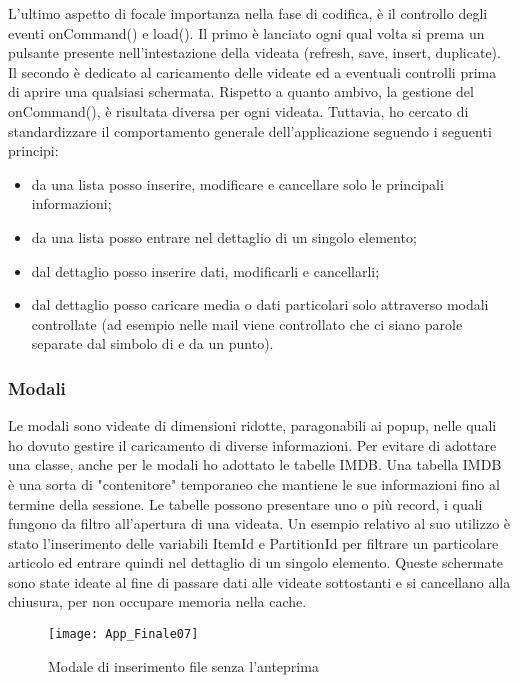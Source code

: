 L'ultimo aspetto di focale importanza nella fase di codifica, è il controllo degli eventi onCommand() e load(). Il primo è lanciato ogni qual volta si prema un pulsante presente nell'intestazione della videata (refresh, save, insert, duplicate).  Il secondo è dedicato al caricamento delle videate ed a eventuali controlli prima di aprire una qualsiasi schermata.
Rispetto a quanto ambivo, la gestione del onCommand(), è risultata diversa per ogni videata.  Tuttavia, ho cercato di standardizzare il comportamento generale dell'applicazione seguendo i seguenti principi:
\begin{itemize}
	\item da una lista posso inserire, modificare e cancellare solo le principali informazioni;
	\item da una lista posso entrare nel dettaglio di un singolo elemento;
	\item dal dettaglio posso inserire dati, modificarli e cancellarli;
	\item dal dettaglio posso caricare media o dati particolari solo attraverso modali controllate (ad esempio nelle mail viene controllato che ci siano parole separate dal simbolo di \@ e da un punto).
\end{itemize}


\subsubsection{Modali}
Le modali sono videate di dimensioni ridotte, paragonabili ai popup, nelle quali ho dovuto gestire il caricamento di diverse informazioni. Per evitare di adottare una classe, anche per le modali ho adottato le tabelle IMDB. 
Una tabella IMDB è una sorta di "contenitore" temporaneo che mantiene le sue informazioni fino al termine della sessione. Le tabelle possono presentare uno o più record, i quali fungono da filtro all'apertura di una videata. Un esempio relativo al suo utilizzo è stato l'inserimento delle variabili ItemId e PartitionId per filtrare un particolare articolo ed entrare quindi nel dettaglio di un singolo elemento.
Queste schermate sono state ideate al fine di passare dati alle videate sottostanti e si cancellano alla chiusura, per non occupare memoria nella cache.

\begin{figure}[!h] 
	\centering 
	\texttt{[image: App\_Finale07]}
	\caption{Modale di inserimento file senza l'anteprima}
	\label{Modale}
\end{figure}


